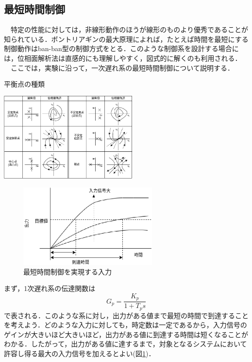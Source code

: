 \documentclass[12pt]{jsarticle}
\begin{document}
\subsection{最短時間制御}
　特定の性能に対しては，非線形動作のほうが線形のものより優秀であることが知られている．ボントリアギンの最大原理によれば，たとえば時間を最短にする制御動作はban-ban型の制御方式をとる．このような制御系を設計する場合には，位相面解析法は直感的にも理解しやすく，図式的に解くのも利用される．\\
　ここでは，実験に沿って，一次遅れ系の最短時間制御について説明する．\\
\begin{table}[tb]
  \begin{center}
    \caption{平衡点の種類}
    \includegraphics[clip,width=7.0cm]{../Img/FigC1.eps}
    \label{FigC1}
  \end{center}
\end{table}
\begin{figure}[tb]
  \begin{center}
    \includegraphics[clip,width=7.0cm]{../Img/FigC4.eps}
    \caption{最短時間制御を実現する入力}
    \label{FigC4}
  \end{center}
\end{figure}
  まず，1次遅れ系の伝達関数は
\begin{equation}
\label{C10}
G_p = \frac{K_p}{1+T_ps}
\end{equation}
で表される．このような系に対し，出力がある値まで最短の時間で到達することを考えよう．どのような入力に対しても，時定数は一定であるから，入力信号のゲインが大きいほど大きいほど，出力がある値に到達する時間は短くなることがわかる．したがって，出力がある値に達するまで，対象となるシステムにおいて許容し得る最大の入力信号を加えるとよい(図\ref{FigC4})．\\
\end{document}
